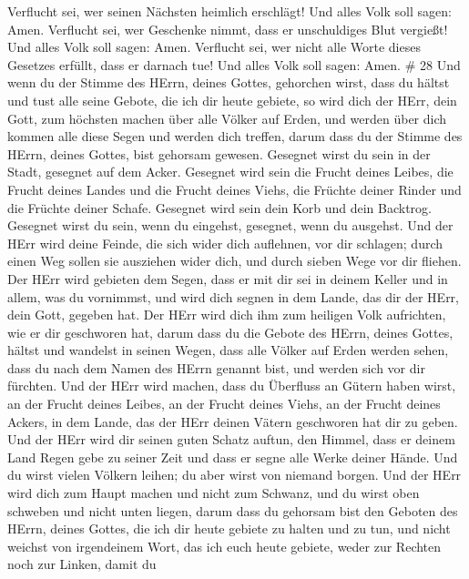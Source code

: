 Verflucht sei, wer seinen Nächsten heimlich erschlägt! Und alles Volk
soll sagen: Amen.  Verflucht sei, wer Geschenke nimmt, dass
er unschuldiges Blut vergießt! Und alles Volk soll sagen: Amen.
 Verflucht sei, wer nicht alle Worte dieses Gesetzes
erfüllt, dass er darnach tue! Und alles Volk soll sagen: Amen. \# 28
 Und wenn du der Stimme des HErrn, deines Gottes, gehorchen
wirst, dass du hältst und tust alle seine Gebote, die ich dir heute
gebiete, so wird dich der HErr, dein Gott, zum höchsten machen über alle
Völker auf Erden,  und werden über dich kommen alle diese
Segen und werden dich treffen, darum dass du der Stimme des HErrn,
deines Gottes, bist gehorsam gewesen.  Gesegnet wirst du
sein in der Stadt, gesegnet auf dem Acker.  Gesegnet wird
sein die Frucht deines Leibes, die Frucht deines Landes und die Frucht
deines Viehs, die Früchte deiner Rinder und die Früchte deiner Schafe.
 Gesegnet wird sein dein Korb und dein Backtrog.
 Gesegnet wirst du sein, wenn du eingehst, gesegnet, wenn du
ausgehst.  Und der HErr wird deine Feinde, die sich wider
dich auflehnen, vor dir schlagen; durch einen Weg sollen sie ausziehen
wider dich, und durch sieben Wege vor dir fliehen.  Der HErr
wird gebieten dem Segen, dass er mit dir sei in deinem Keller und in
allem, was du vornimmst, und wird dich segnen in dem Lande, das dir der
HErr, dein Gott, gegeben hat.  Der HErr wird dich ihm zum
heiligen Volk aufrichten, wie er dir geschworen hat, darum dass du die
Gebote des HErrn, deines Gottes, hältst und wandelst in seinen Wegen,
 dass alle Völker auf Erden werden sehen, dass du nach dem
Namen des HErrn genannt bist, und werden sich vor dir fürchten.
 Und der HErr wird machen, dass du Überfluss an Gütern
haben wirst, an der Frucht deines Leibes, an der Frucht deines Viehs, an
der Frucht deines Ackers, in dem Lande, das der HErr deinen Vätern
geschworen hat dir zu geben.  Und der HErr wird dir seinen
guten Schatz auftun, den Himmel, dass er deinem Land Regen gebe zu
seiner Zeit und dass er segne alle Werke deiner Hände. Und du wirst
vielen Völkern leihen; du aber wirst von niemand borgen. 
Und der HErr wird dich zum Haupt machen und nicht zum Schwanz, und du
wirst oben schweben und nicht unten liegen, darum dass du gehorsam bist
den Geboten des HErrn, deines Gottes, die ich dir heute gebiete zu
halten und zu tun,  und nicht weichst von irgendeinem Wort,
das ich euch heute gebiete, weder zur Rechten noch zur Linken, damit du
